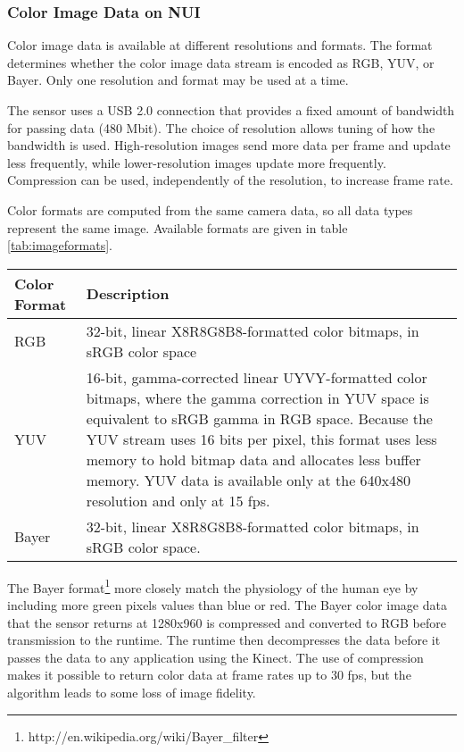 \subsubsection{Color Image Data on NUI}
Color image data is available at different resolutions and formats. The format determines whether the color image data stream is encoded as RGB, YUV, or Bayer. Only one resolution and format may be used at a time.

The sensor uses a USB 2.0 connection that provides a fixed amount of bandwidth for passing data (480 Mbit). The choice of resolution allows tuning of how the bandwidth is used. High-resolution images send more data per frame and update less frequently, while lower-resolution images update more frequently. Compression can be used, independently of the resolution, to increase frame rate.

Color formats are computed from the same camera data, so all data types represent the same image.
Available formats are given in table \ref{tab:imageformats}. 

\begin{table*}
\center
\begin{tabular}{|l|p{30em}|} \hline
Color Format 	& Description \\\hline
RGB 		& 32-bit, linear X8R8G8B8-formatted color bitmaps, in sRGB color space \\\hline
YUV 		& 16-bit, gamma-corrected linear UYVY-formatted color bitmaps, where the gamma correction in YUV space is equivalent to sRGB gamma in RGB space. Because the YUV stream uses 16 bits per pixel, this format uses less memory to hold bitmap data and allocates less buffer memory. YUV data is available only at the 640x480 resolution and only at 15 fps. \\\hline
Bayer		& 32-bit, linear X8R8G8B8-formatted color bitmaps, in sRGB color space. \\\hline
\end{tabular}
\caption{Kinect NUI supported image formats}
\label{tab:imageformats}
\end{table*}

The Bayer format\footnote{http://en.wikipedia.org/wiki/Bayer\_filter} more closely match the physiology of the human eye by including more green pixels values than blue or red. The Bayer color image data that the sensor returns at 1280x960 is compressed and converted to RGB before transmission to the runtime. The runtime then decompresses the data before it passes the data to any application using the Kinect. The use of compression makes it possible to return color data at frame rates up to 30 fps, but the algorithm leads to some loss of image fidelity.

